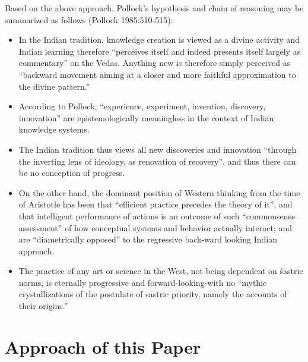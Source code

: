 Based on the above approach, Pollock's hypothesis and chain of reasoning may be summarized as follows (Pollock 1985:510-515): 
\begin{itemize}
\item In the Indian tradition, knowledge creation is viewed as a divine activity and Indian learning therefore ``perceives itself and indeed presents itself largely as commentary'' on the Vedas. Anything new is therefore simply perceived as ``backward movement aiming at a closer and more faithful approximation to the divine pattern.''

\item According to Pollock, ``experience, experiment, invention, discovery, innovation'' are epistemologically meaningless in the context of Indian knowledge systems.

\item The Indian tradition thus views all new discoveries and innovation ``through the inverting lens of ideology, as renovation of recovery'', and thus there can be no conception of progress.

\item On the other hand, the dominant position of Western thinking from the time of Aristotle has been that ``efficient practice precedes the theory of it'', and that intelligent performance of actions is an outcome of such ``commonsense assessment'' of how conceptual systems and behavior actually interact; and are ``diametrically opposed'' to the regressive back-ward looking Indian approach. 

\item The practice of any art or science in the West, not being dependent on śāstric norms, is eternally progressive and forward-looking-with no ``mythic crystallizations of the postulate of sastric priority, namely the accounts of their origins.''
\end{itemize}

\section*{Approach of this Paper}


